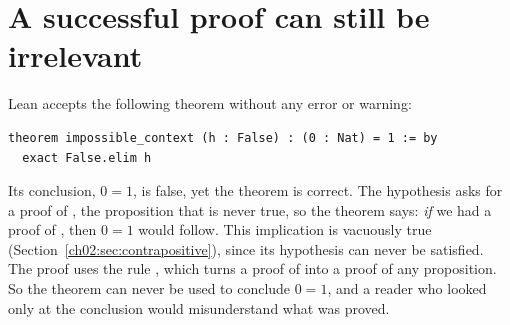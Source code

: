 \section{A successful proof can still be irrelevant}\label{ch16:sec:irrelevant}
Lean accepts the following theorem without any error or warning:
\par\noindent\begin{minipage}{\linewidth}
\begin{lstlisting}
theorem impossible_context (h : False) : (0 : Nat) = 1 := by
  exact False.elim h
\end{lstlisting}
\end{minipage}\par

Its conclusion, $0=1$, is false, yet the theorem is correct. The hypothesis  asks for a proof of , the proposition that is never true, so the theorem says: \emph{if} we had a proof of , then $0=1$ would follow. This implication is vacuously true (Section~\ref{ch02:sec:contrapositive}), since its hypothesis can never be satisfied. The proof uses the rule , which turns a proof of  into a proof of any proposition. So the theorem can never be used to conclude $0=1$, and a reader who looked only at the conclusion would misunderstand what was proved.

